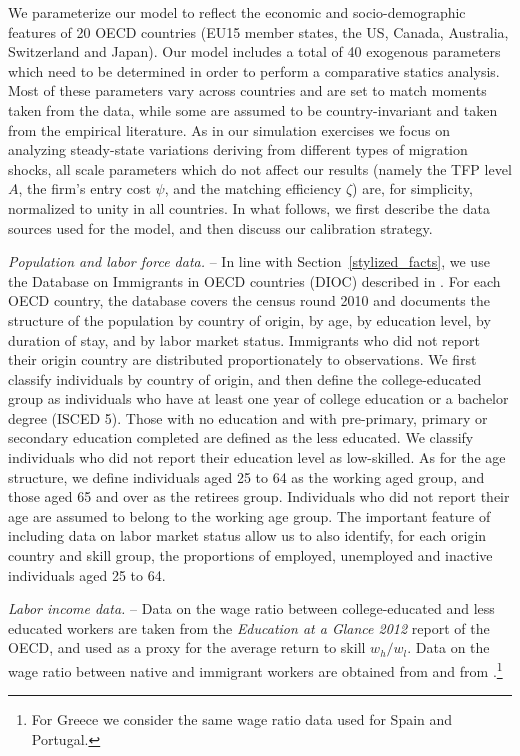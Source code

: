 \documentclass[a4paper,12pt]{article}
\begin{document}
We parameterize our model to reflect the economic and socio-demographic features of 20 OECD countries (EU15 member states, the US, Canada, Australia, Switzerland and Japan). 
Our model includes a total of 40 exogenous parameters which need to be determined in order to perform a comparative statics analysis. Most of these parameters vary across countries and are set to match moments taken from the data, while some are assumed to be country-invariant and taken from the empirical literature. As in our simulation exercises we focus on analyzing steady-state variations deriving from different types of migration shocks, all scale parameters which do not affect our results (namely the TFP level $A$, the firm's entry cost  $\psi$, and the matching efficiency $\zeta$) are, for simplicity, normalized to unity in all countries. In what follows, we first describe the data sources used for the model, and then discuss our calibration strategy.

\emph{Population and labor force data.} -- In  line  with  Section~\ref{stylized_facts},  we  use  the  Database  on  Immigrants in OECD countries (DIOC) described in \citet{Arslan2014}. For each OECD country, the database covers the census round 2010 and documents the structure of the population by country of origin, by age, by education level, by duration of stay, and by labor market status.  Immigrants who did not report their origin country are distributed proportionately to observations. We first classify individuals by country of origin, and then define the college-educated group as individuals who have at least one year of college education or a bachelor degree (ISCED 5).  Those with no education and with pre-primary, primary or secondary education completed are defined as the less educated. We classify individuals who did not report their education level
as low-skilled.  As for the age structure, we define individuals aged 25 to 64 as the working
aged group, and  those aged 65 and over as the retirees group. Individuals who did not report their age are assumed to belong to the working age group. The important feature of including data on labor market status allow us to also identify, for each origin country and skill group, the proportions of employed, unemployed and inactive individuals aged 25 to 64.

\emph{Labor income data.} -- Data on the wage ratio between college-educated and less educated workers are taken from the \textit{Education at a Glance 2012} report of the OECD, and used  as a proxy for the average return to skill $w_h/w_l$. Data on the wage ratio between native and immigrant workers are obtained from \citet{Buchel2005} and from \citet{Docquier2014}.\footnote{For Greece we consider the same wage ratio data used for Spain and Portugal.}
\end{document}
